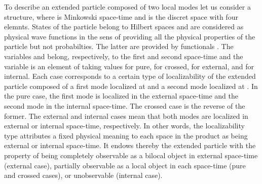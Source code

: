 \documentclass[12pt,a4paper]{article}
\begin{document}
To describe an extended particle composed of two local modes let us consider a
\coordHE{} structure, where \coordHE{} is
Minkowski space-time and \coordHE{} is the discret space with four elemnts.
States \coordHE{} of the particle belong to Hilbert spaces \coordHE{} and are
considered as physical wave functions in the sens of providing all the
physical properties of the particle but not probabilties. The latter are
provided by functionals \coordHE{}.\cite{Destouches 1956} The variables \coordHE{} and \myHighlight{$\xi$}\coordHE{} belong,
respectively, to the first and second space-time and the variable \coordHE{} is an
element of \coordHE{} taking values \coordHE{} for pure, \coordHE{} for crossed, \coordHE{} for
external, and \coordHE{} for internal. Each case corresponds to a certain type of
localizability of the extended particle composed of a first mode localized at
\coordHE{} and a second mode localized at \myHighlight{$\xi$}\coordHE{}. In the pure case, the first mode is
localized in the external space-time and the second mode in the internal
space-time. The crossed case is the reverse of the former. The external and
internal cases mean that both modes are localized in external or internal
space-time, respectively. In other words, the localizability type \coordHE{}
attributes a fixed physical meaning to each space in the product \coordHE{} as being external or internal space-time. It
endows thereby the extended particle with the property of being completely
observable as a bilocal object in external space-time (external case),
partially observable as a local object in each space-time (pure and crossed
cases), or unobservable (internal case).
\end{document}
